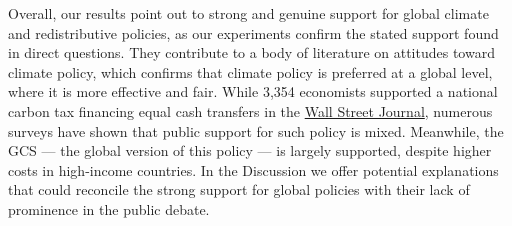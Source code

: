 \begin{bibunit}
Overall, our results %
point out to strong and genuine support for global climate and redistributive policies, as our experiments confirm the stated support found in direct questions. 
They contribute to a body of literature on attitudes toward climate policy, which confirms that climate policy is preferred at a global level,\citep{issp_international_2010,beiser-mcgrath_could_2019,sivonen_attitudes_2022,meilland_international_2023} where it is more effective and fair. 
While 3,354 economists supported a national carbon tax financing equal cash transfers in the \href{https://www.clcouncil.org/media/EconomistsStatement.pdf}{Wall Street Journal}, numerous surveys have shown that public support for such policy is mixed.\citep{douenne_yellow_2022,dechezlepretre_fighting_nodate,carattini_overcoming_2018,maestre-andres_perceived_2019,mildenberger_limited_2022,sommer_supporting_2022} Meanwhile, the GCS --- the global version of this policy --- is largely supported, despite higher costs in high-income countries. 
In the Discussion we offer potential explanations that could reconcile the strong support for global policies with their lack of prominence in the public debate. %



\end{bibunit}
